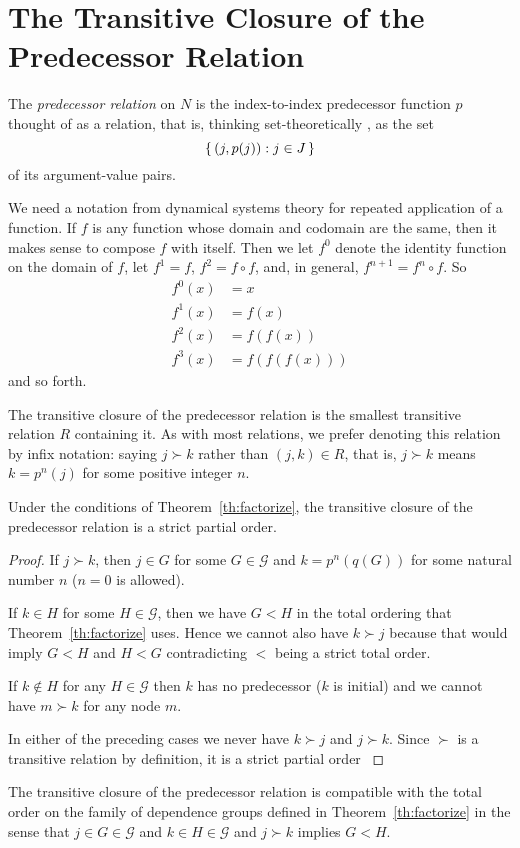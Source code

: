 \section{The Transitive Closure of the Predecessor Relation}
\label{sec:closure}

The \emph{predecessor relation} on $N$ is the index-to-index predecessor
function $p$ thought
of as a relation, that is, thinking set-theoretically
\citep[Section~7]{halmos-set-theory}, as the set
$$
   \{\,  (j, p(j)) : j \in J  \,\}
$$
of its argument-value pairs.

We need a notation from dynamical systems theory for repeated application
of a function.  If $f$ is any function whose domain and codomain are the same,
then it makes sense to compose $f$ with itself.  Then we let $f^0$ denote
the identity function on the domain of $f$, let $f^1 = f$, $f^2 = f \circ f$,
and, in general, $f^{n + 1} = f^n \circ f$.
So
\begin{align*}
   f^0(x) & = x
   \\
   f^1(x) & = f(x)
   \\
   f^2(x) & = f(f(x))
   \\
   f^3(x) & = f(f(f(x)))
\end{align*}
and so forth.

The transitive closure of the predecessor relation
is the smallest transitive relation $R$ containing it.
As with most relations, we prefer denoting this relation by infix notation:
saying $j \succ k$ rather than $(j, k) \in R$, that is, $j \succ k$ means
$k = p^n(j)$ for some positive integer $n$.

\begin{theorem} \label{th:transitive-closure}
Under the conditions of Theorem~\ref{th:factorize},
the transitive closure of the predecessor relation is a strict partial order.
\end{theorem}
\begin{proof}
If $j \succ k$, then $j \in G$ for some $G \in \mathcal{G}$ and
$k = p^n(q(G))$ for some natural number $n$ ($n = 0$ is allowed).

If $k \in H$ for some $H \in \mathcal{G}$,
then we have $G < H$ in the total ordering
that Theorem~\ref{th:factorize} uses.
Hence we cannot also have $k \succ j$ because that would imply $G < H$
and $H < G$ contradicting $<$ being a strict total order.

If $k \notin H$ for any $H \in \mathcal{G}$ then $k$ has no predecessor
($k$ is initial) and we cannot have $m \succ k$ for any node $m$.

In either of the preceding cases we never have $k \succ j$ and $j \succ k$.
Since $\succ$ is a transitive relation by definition, it is
a strict partial order \citep[Section~14]{halmos-set-theory}
\end{proof}
\begin{corollary} \label{cor:compatible}
The transitive closure of the predecessor relation is compatible with
the total order on the family of dependence groups defined
in Theorem~\ref{th:factorize} in the sense that
$j \in G \in \mathcal{G}$ and $k \in H \in \mathcal{G}$ and $j \succ k$
implies $G < H$.
\end{corollary}

